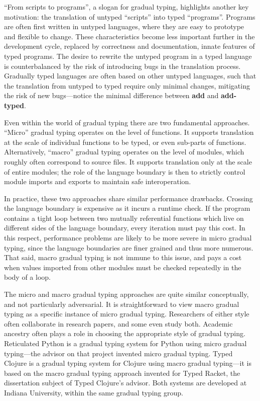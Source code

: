 \documentclass[10pt]{article}
\begin{document}
``From scripts to programs'', a slogan for gradual typing, highlights another key motivation: the translation of untyped ``scripts'' into typed ``programs''.
Programs are often first written in untyped languages, where they are easy to prototype and flexible to change. 
These characteristics become less important further in the development cycle, replaced
by correctness and documentation, innate features of typed programs.
The desire to rewrite the untyped program in a typed language is counterbalanced by the risk of introducing bugs in the translation process.
Gradually typed languages are often based on other untyped languages, such that the translation from untyped to typed require only minimal changes, mitigating
the risk of new bugs---notice the minimal difference between \textbf{add} and \textbf{add-typed}.

Even within the world of gradual typing there are two fundamental approaches.
``Micro'' gradual typing operates on the level of functions. 
It supports translation at the scale of individual functions to be typed, or even sub-parts of functions.
Alternatively, ``macro'' gradual typing operates on the level of modules, which roughly often correspond to source files.
It supports translation only at the scale of entire modules;
the role of the language boundary is then to 
strictly control module imports and exports to maintain safe interoperation.

In practice, these two approaches share similar performance drawbacks.
Crossing the language boundary is expensive as it incurs a runtime check.
If the program contains a tight loop between two mutually referential functions 
which live on different sides of the language boundary, every iteration must
pay this cost.
In this respect, performance problems are likely to be more severe in micro
gradual typing, since the language boundaries are finer grained and thus
more numerous.
That said, macro gradual typing is not immune to this issue, and pays a
cost when values imported from other modules must be checked repeatedly
in the body of a loop.

The micro and macro gradual typing approaches are quite similar conceptually, and not particularly adversarial.
It is straightforward to view macro gradual typing as a specific instance of micro gradual typing.
Researchers of either style often collaborate in research papers, and some even study both.
Academic ancestry often plays a role in choosing the appropriate style of gradual typing.
Reticulated Python is a gradual typing system for Python using micro gradual typing---the advisor on that project invented micro gradual typing.
Typed Clojure is a gradual typing system for Clojure using macro gradual typing---it is based on the macro gradual typing approach invented for Typed Racket, the dissertation
subject of Typed Clojure's advisor.
Both systems are developed at Indiana University, within the same gradual typing group.
\end{document}
